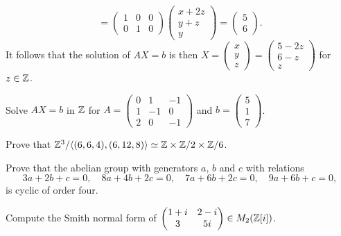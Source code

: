 \begin{example}
\[		=
	\begin{pmatrix}
		1 & 0 & 0\\
		0 & 1 & 0
	\end{pmatrix}\begin{pmatrix}
		x+2z\\
		y+z\\
		y
	\end{pmatrix}
	=\begin{pmatrix}
		5\\
		6
	\end{pmatrix}.
	\]
	It follows that the solution of $AX=b$ is then $X=\begin{pmatrix}
		x\\
		y\\
		z
	\end{pmatrix}
	=\begin{pmatrix}
		5-2z\\
		6-z\\
		z
	\end{pmatrix}$ for $z\in\mathbb{Z}$. 
\end{example}

\begin{exercise}
	\label{xca:AX=b}
	Solve $AX=b$ in $\mathbb{Z}$ for $A=\begin{pmatrix}
		0 & 1 & -1\\
		1 & -1 & 0\\
		2 & 0 & -1
	\end{pmatrix}$ and $b=\begin{pmatrix}
		5\\
		1\\
		7
	\end{pmatrix}$. 
\end{exercise}

\begin{exercise}
	\label{xca:factors_260}
	Prove that $\mathbb{Z}^3/\langle
	(6,6,4),(6,12,8)\rangle\simeq\mathbb{Z}\times\mathbb{Z}/2\times\mathbb{Z}/6$.
\end{exercise}

\begin{exercise}
\label{xca:C4}
    Prove that the abelian group with generators 
    $a$, $b$ and $c$ with relations
    \[
    3a+2b+c=0,
    \quad
    8a+4b+2c=0,
    \quad
    7a+6b+2c=0,
    \quad
    9a+6b+c=0,
    \]
    is cyclic of order four.
\end{exercise}

\begin{exercise}
	\label{xca:Smith_Z[i]}
	Compute the Smith normal 
	form of 
	$\begin{pmatrix}
		1+i & 2-i\\
		3 & 5i
	\end{pmatrix}\in M_2(\mathbb{Z}[i])$. 
\end{exercise}

